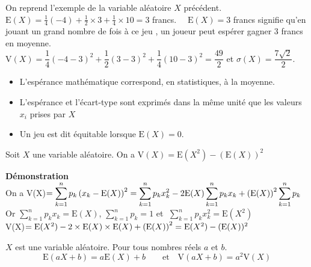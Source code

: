 \begin{example}
On reprend l'exemple de la variable aléatoire $ X $ précédent.\\ $\text{E}(X)=\frac{1}{4}(-4)+\frac{1}{2}\times 3 +\frac{1}{4}\times 10 =3$ francs. $ \quad\text{E}(X)=3$ francs    signifie qu'en jouant un grand  nombre de fois  à ce jeu , un joueur peut espérer gagner $ 3$ francs    en moyenne.\\ $ \text{V}(X)= \dfrac{1}{4}(-4-3)^{2}+\dfrac{1}{2}(3-3)^{2}+\dfrac{1}{4}(10-3)^{2}=\dfrac{49}{2} $ \;\;et \quad $ \sigma(X)=\dfrac{7\sqrt{2}}{2} $.
\end{example}
\begin{remark}
\begin{itemize}
\item   L'espérance mathématique correspond, en statistiques, à la moyenne.
\item L'espérance et l'écart-type sont exprimés dans la même unité que les valeurs $ x_{i} $ prises par $ X $
\item Un jeu est dit équitable lorsque $ \text{E}(X)=0.$
\end{itemize}
\end{remark}
\begin{property}
Soit $ X  $ une  variable aléatoire. On a \; $ \text{V}(X)=  \text{E}(X^{2})- (\text{E}(X))^{2} $
\end{property}
\textbf{Démonstration}\\
On a V(X)$ =\displaystyle\sum_{k=1}^n p_{k}\left(x_{k}-\text{E}(X)\right)^{2}=\displaystyle\sum_{k=1}^n p_{k}x_{k}^{2}-2\text{E}(X)\displaystyle\sum_{k=1}^n p_{k}x_{k}+ \left(\text{E}(X)\right)^{2}\displaystyle\sum_{k=1}^n p_{k}$\\
Or $\displaystyle \sum_{k=1}^n p_{k}x_{k}=\text{E}(X) $,\;  $\displaystyle\sum_{k=1}^n p_{k}=1  $\; et  $\;\displaystyle \sum_{k=1}^n p_{k}x_{k}^{2}=\text{E}(X^{2}) $\\

V(X)$ =\text{E}(X^{2})-2\times \text{E}(X)\times \text{E}(X)+\left(\text{E}(X)\right)^{2} =\text{E}(X^{2})- (\text{E}(X))^{2}$

\begin{property}[Admise]
$ X $  est une  variable aléatoire. Pour  tous nombres réels $a $ et $b $.
 $$\text{E}(aX+b)=a\text{E}(X)+b     \qquad  \text{et} \quad  \text{V}(aX+b)=a^{2}\text{V}(X) $$
\end{property}

   

